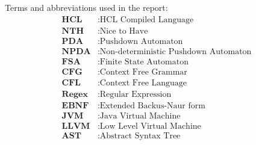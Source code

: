 
Terms and abbreviations used in the report:
\begin{align*}
	\textbf{HCL} &: \text{HCL Compiled Language} \\
    \textbf{NTH} &: \text{Nice to Have} \\
    \textbf{PDA} &: \text{Pushdown Automaton} \\
    \textbf{NPDA} &: \text{Non-deterministic Pushdown Automaton} \\
    \textbf{FSA} &: \text{Finite State Automaton} \\
    \textbf{CFG} &: \text{Context Free Grammar} \\
    \textbf{CFL} &: \text{Context Free Language} \\
    \textbf{Regex} &: \text{Regular Expression} \\
    \textbf{EBNF} &: \text{Extended Backus-Naur form} \\
    \textbf{JVM} &: \text{Java Virtual Machine} \\
    \textbf{LLVM} &: \text{Low Level Virtual Machine} \\
    \textbf{AST} &: \text{Abstract Syntax Tree} \\
\end{align*}